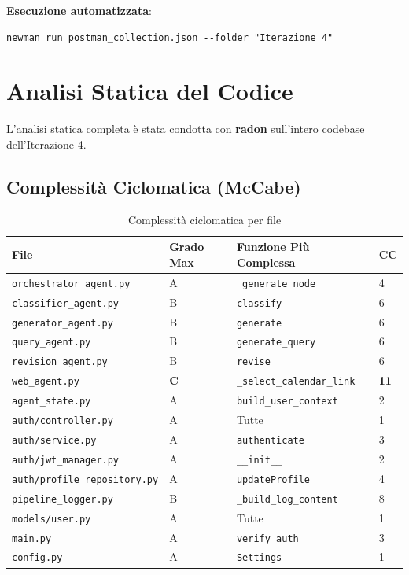 \documentclass[a4paper,12pt]{report}
\begin{document}
\textbf{Esecuzione automatizzata}:
\begin{verbatim}
newman run postman_collection.json --folder "Iterazione 4"
\end{verbatim}

\section{Analisi Statica del Codice}
\label{sec:analisi-statica-completa}

L'analisi statica completa è stata condotta con \textbf{radon} sull'intero codebase dell'Iterazione 4.

\subsection{Complessità Ciclomatica (McCabe)}

\begin{table}[H]
\centering
\small
\begin{tabularx}{\textwidth}{l l X l}
\toprule
\textbf{File} & \textbf{Grado Max} & \textbf{Funzione Più Complessa} & \textbf{CC} \\
\midrule
\texttt{orchestrator\_agent.py} & A & \texttt{\_generate\_node} & 4 \\
\texttt{classifier\_agent.py} & B & \texttt{classify} & 6 \\
\texttt{generator\_agent.py} & B & \texttt{generate} & 6 \\
\texttt{query\_agent.py} & B & \texttt{generate\_query} & 6 \\
\texttt{revision\_agent.py} & B & \texttt{revise} & 6 \\
\texttt{web\_agent.py} & \textbf{C} & \texttt{\_select\_calendar\_link} & \textbf{11} \\
\texttt{agent\_state.py} & A & \texttt{build\_user\_context} & 2 \\
\texttt{auth/controller.py} & A & Tutte & 1 \\
\texttt{auth/service.py} & A & \texttt{authenticate} & 3 \\
\texttt{auth/jwt\_manager.py} & A & \texttt{\_\_init\_\_} & 2 \\
\texttt{auth/profile\_repository.py} & A & \texttt{updateProfile} & 4 \\
\texttt{pipeline\_logger.py} & B & \texttt{\_build\_log\_content} & 8 \\
\texttt{models/user.py} & A & Tutte & 1 \\
\texttt{main.py} & A & \texttt{verify\_auth} & 3 \\
\texttt{config.py} & A & \texttt{Settings} & 1 \\
\bottomrule
\end{tabularx}
\caption{Complessità ciclomatica per file}
\end{table}
\end{document}
